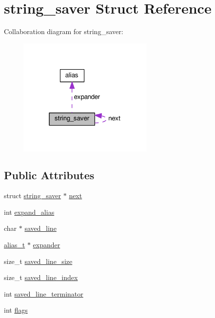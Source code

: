 \hypertarget{structstring__saver}{}\section{string\+\_\+saver Struct Reference}
\label{structstring__saver}


Collaboration diagram for string\+\_\+saver\+:
\nopagebreak
\begin{figure}[H]
\begin{center}
\leavevmode
\includegraphics[width=190pt]{structstring__saver__coll__graph}
\end{center}
\end{figure}
\subsection*{Public Attributes}
\begin{DoxyCompactItemize}
\item 
struct \hyperlink{structstring__saver}{string\+\_\+saver} $\ast$ \hyperlink{structstring__saver_a7d78d802062d901feca18c960c95a286}{next}
\item 
int \hyperlink{structstring__saver_a3be05cc2cb341891312765ed8fd024d7}{expand\+\_\+alias}
\item 
char $\ast$ \hyperlink{structstring__saver_a8d76b634850f05cd2de7d3d9dfc489f1}{saved\+\_\+line}
\item 
\hyperlink{alias_8h_a11c6bae002d90e8dad2d17b87ba6cccf}{alias\+\_\+t} $\ast$ \hyperlink{structstring__saver_aa39cdb834c5e9118697e0c532b774ef8}{expander}
\item 
size\+\_\+t \hyperlink{structstring__saver_a86322652dc4c4f9aa6896304a41f8bf0}{saved\+\_\+line\+\_\+size}
\item 
size\+\_\+t \hyperlink{structstring__saver_aeabbc475d86ac4ab300b4b76bf2cbcc3}{saved\+\_\+line\+\_\+index}
\item 
int \hyperlink{structstring__saver_a905ce4a868ffb0d22b49216b8711f65e}{saved\+\_\+line\+\_\+terminator}
\item 
int \hyperlink{structstring__saver_afda7fc1510b844cf3166fbf5383c0c45}{flags}
\end{DoxyCompactItemize}



